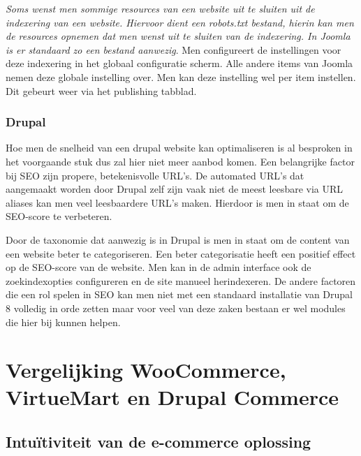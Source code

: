 \textit{Soms wenst men sommige resources van een website uit te sluiten uit de indexering van een website. Hiervoor dient een robots.txt bestand, hierin kan men de resources opnemen dat men wenst uit te sluiten van de indexering. In Joomla is er standaard zo een bestand aanwezig}.\autocite{JoomlaCommunity2019e} Men configureert de instellingen voor deze indexering in het globaal configuratie scherm. Alle andere items van Joomla nemen deze globale instelling over. Men kan deze instelling wel per item instellen. Dit gebeurt weer via het publishing tabblad.

\subsubsection{Drupal}
Hoe men de snelheid van een drupal website kan optimaliseren is al besproken in het voorgaande stuk dus zal hier niet meer aanbod komen. Een belangrijke factor bij SEO zijn propere, betekenisvolle URL's. De automated URL's dat aangemaakt worden door Drupal zelf zijn vaak niet de meest leesbare via URL aliases kan men veel leesbaardere URL's maken. Hierdoor is men in staat om de SEO-score te verbeteren.

Door de taxonomie dat aanwezig is in Drupal is men in staat om de content van een website beter te categoriseren. Een beter categorisatie heeft een positief effect op de SEO-score van de website. Men kan in de admin interface ook de zoekindexopties configureren en de site manueel herindexeren. De andere factoren die een rol spelen in SEO kan men niet met een standaard installatie van Drupal 8 volledig in orde zetten maar voor veel van deze zaken bestaan er wel modules die hier bij kunnen helpen.
\section{Vergelijking WooCommerce, VirtueMart en Drupal Commerce }
\subsection{Intuïtiviteit van de e-commerce oplossing}
